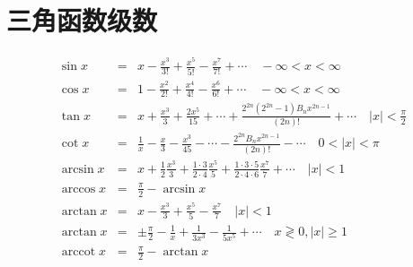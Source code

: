 \section{三角函数级数}


\begin{eqnarray}
    \sin x & = & x-\frac{x^3}{3!}+\frac{x^5}{5!}-\frac{x^7}{7!}+\cdots \quad -\infty<x<\infty \\
    \cos x & = & 1-\frac{x^2}{2!}+\frac{x^4}{4!}-\frac{x^6}{6!}+\cdots \quad -\infty<x<\infty \\
    \tan x & = & x+\frac{x^3}{3}+\frac{2 x^5}{15}+\cdots+\frac{2^{2 n}\left(2^{2 n}-1\right) B_n x^{2 n-1}}{(2 n)!}+\cdots \quad |x|<\frac{\pi}{2} \\
    \cot x & = & \frac{1}{x}-\frac{x}{3}-\frac{x^3}{45}-\cdots-\frac{2^{2 n} B_n x^{2 n-1}}{(2 n)!}-\cdots \quad 0<|x|<\pi \\
    \arcsin x & = & x+\frac{1}{2} \frac{x^3}{3}+\frac{1 \cdot 3}{2 \cdot 4} \frac{x^5}{5}+\frac{1 \cdot 3 \cdot 5}{2 \cdot 4 \cdot 6} \frac{x^7}{7}+\cdots \quad |x|<1 \\
    \arccos x & = & \frac{\pi}{2}-\arcsin x \\
    \arctan x & = & x-\frac{x^3}{3}+\frac{x^5}{5}-\frac{x^7}{7} \quad |x| < 1 \\
    \arctan x & = & \pm \frac{\pi}{2}-\frac{1}{x}+\frac{1}{3 x^3}-\frac{1}{5 x^5}+\cdots \quad x \gtrless 0, |x| \geq 1 \\
    \operatorname{arccot} x & = & \frac{\pi}{2}-\arctan x
\end{eqnarray}

